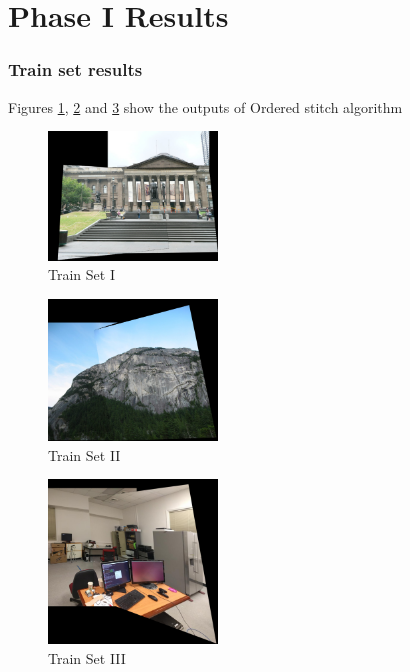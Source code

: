 \documentclass[conference]{IEEEtran}
\begin{document}
\section{Phase I Results} \label{results_phase_I}
\subsubsection{Train set results}
Figures \ref{fig:train_set_I}, \ref{fig:train_set_II} and \ref{fig:train_set_III} show the outputs of Ordered stitch algorithm 

\begin{figure}[!htbp]
  \centering
  \includegraphics[width=0.4\textwidth]{phase1/set1_clear_stitch123.png}
  \caption{Train Set I}
  \label{fig:train_set_I}
\end{figure}


\begin{figure}[!htbp]
  \centering
  \includegraphics[width=0.4\textwidth]{phase1/set2_clear_stitch3.png}
  \caption{Train Set II}
  \label{fig:train_set_II}
\end{figure}


\begin{figure}[!htbp]
  \centering
  \includegraphics[width=0.4\textwidth]{phase1/set3_clear_stitch12.png}
  \caption{Train Set III}
  \label{fig:train_set_III}
\end{figure}
\end{document}
